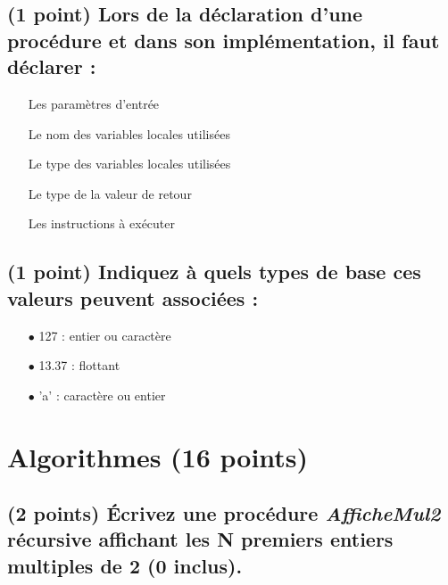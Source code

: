 \documentclass[11pt,a4paper]{article}
\begin{document}
\bigskip

\subsection{(1 point) Lors de la déclaration d'une procédure et dans son implémentation, il faut déclarer : }

\bigskip

\begin{itemize}
  \item[\checkmark] Les paramètres d'entrée   \phantom{(}
  \item[\checkmark] Le nom des variables locales utilisées   \phantom{(}
  \item[\checkmark] Le type des variables locales utilisées   \phantom{(}
  \item[\CaseCoche] Le type de la valeur de retour   \phantom{(}
  \item[\checkmark] Les instructions à exécuter   \phantom{(}
\end{itemize}

\bigskip

\subsection{(1 point) Indiquez à quels types de base ces valeurs peuvent associées : }

\bigskip

\begin{itemize}
  \item[$\bullet$] 127   : entier ou caractère \phantom{(} \\
  \item[$\bullet$] 13.37 : flottant            \phantom{(} \\
  \item[$\bullet$] 'a'   : caractère ou entier \phantom{(} \\
\end{itemize}

\vfillLast

\newpage


\section{Algorithmes (16 points)}

\subsection{(2 points) \'Ecrivez une procédure \og \textit{AfficheMul2} \fg{} récursive affichant les N premiers entiers multiples de 2 (0 inclus). }
\end{document}

